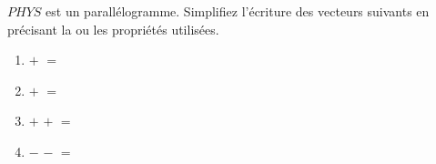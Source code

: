 \exercice $PHYS$ est un parallélogramme. Simplifiez l'écriture des vecteurs suivants en précisant la ou les propriétés utilisées.
\begin{enumerate}
	\item {} $+$  $=$ \\
	\item {} $+$  $=$ \\
	\item {} $+$  $+$  $=$ \\
	\item {} $-$  $-$  $=$ \\
\end{enumerate}






%
%
